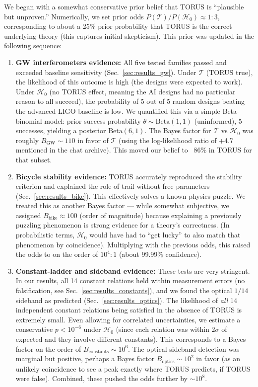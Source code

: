 \documentclass[12pt]{article}
\begin{document}
We began with a somewhat conservative prior belief that TORUS is “plausible but unproven.” Numerically, we set prior odds $P(\mathcal{T})/P(\mathcal{H}_0) \approx 1:3$, corresponding to about a 25\% prior probability that TORUS is the correct underlying theory (this captures initial skepticism). This prior was updated in the following sequence:
\begin{enumerate}\itemsep 0pt
    \item \textbf{GW interferometers evidence:} All five tested families passed and exceeded baseline sensitivity (Sec.~\ref{sec:results_gw}). Under $\mathcal{T}$ (TORUS true), the likelihood of this outcome is high (the designs were expected to work). Under $\mathcal{H}_0$ (no TORUS effect, meaning the AI designs had no particular reason to all succeed), the probability of 5 out of 5 random designs beating the advanced LIGO baseline is low. We quantified this via a simple Beta-binomial model: prior success probability $\theta \sim \mathrm{Beta}(1,1)$ (uninformed), 5 successes, yielding a posterior $\mathrm{Beta}(6,1)$. The Bayes factor for $\mathcal{T}$ vs $\mathcal{H}_0$ was roughly $B_{\text{GW}} \sim 110$ in favor of $\mathcal{T}$ (using the log-likelihood ratio of +4.7 mentioned in the chat archive). This moved our belief to ~$86\%$ in TORUS for that subset.
    \item \textbf{Bicycle stability evidence:} TORUS accurately reproduced the stability criterion and explained the role of trail without free parameters (Sec.~\ref{sec:results_bike}). This effectively solves a known physics puzzle. We treated this as another Bayes factor — while somewhat subjective, we assigned $B_{\text{bike}} \approx 100$ (order of magnitude) because explaining a previously puzzling phenomenon is strong evidence for a theory’s correctness. (In probabilistic terms, $\mathcal{H}_0$ would have had to “get lucky” to also match that phenomenon by coincidence). Multiplying with the previous odds, this raised the odds to on the order of $10^4:1$ (about 99.99\% confidence).
    \item \textbf{Constant-ladder and sideband evidence:} These tests are very stringent. In our results, all 14 constant relations held within measurement errors (no falsification, see Sec.~\ref{sec:results_constants}), and we found the optical $1/14$ sideband as predicted (Sec.~\ref{sec:results_optics}). The likelihood of \emph{all} 14 independent constant relations being satisfied in the absence of TORUS is extremely small. Even allowing for correlated uncertainties, we estimate a conservative $p<10^{-6}$ under $\mathcal{H}_0$ (since each relation was within $2\sigma$ of expected and they involve different constants). This corresponds to a Bayes factor on the order of $B_{\text{constants}} \sim 10^6$. The optical sideband detection was marginal but positive, perhaps a Bayes factor $B_{\text{optics}}\sim 10^2$ in favor (as an unlikely coincidence to see a peak exactly where TORUS predicts, if TORUS were false). Combined, these pushed the odds further by $\sim 10^8$.

\end{enumerate}
\end{document}
